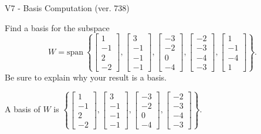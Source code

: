 \begin{exercise}
  \begin{exerciseTitle}V7 - Basis Computation (ver. 738)\end{exerciseTitle}
  \begin{exerciseStatement}
    Find a basis for the subspace 
\[W=\mathrm{span}\ \left\{\left[\begin{array}{r}
1 \\
-1 \\
2 \\
-2
\end{array}\right] , \left[\begin{array}{r}
3 \\
-1 \\
-1 \\
-1
\end{array}\right] , \left[\begin{array}{r}
-3 \\
-2 \\
0 \\
-4
\end{array}\right] , \left[\begin{array}{r}
-2 \\
-3 \\
-4 \\
-3
\end{array}\right] , \left[\begin{array}{r}
1 \\
-1 \\
-4 \\
1
\end{array}\right]\right\}.\]
 Be sure to explain why your result is a basis.


  \end{exerciseStatement}
  \begin{exerciseAnswer}
   A basis of \(W\) is  \(\left\{\left[\begin{array}{r}
1 \\
-1 \\
2 \\
-2
\end{array}\right] , \left[\begin{array}{r}
3 \\
-1 \\
-1 \\
-1
\end{array}\right] , \left[\begin{array}{r}
-3 \\
-2 \\
0 \\
-4
\end{array}\right] , \left[\begin{array}{r}
-2 \\
-3 \\
-4 \\
-3
\end{array}\right]\right\}\).
  


  \end{exerciseAnswer}
\end{exercise}